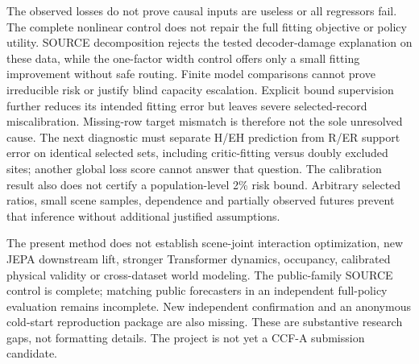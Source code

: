 \documentclass[10pt,twocolumn,letterpaper]{article}
\begin{document}
The observed losses do not prove causal inputs are useless or all regressors
fail. The complete nonlinear control does not repair the full fitting objective
or policy utility. SOURCE decomposition rejects the tested decoder-damage
explanation on these data, while the one-factor width control offers only a
small fitting improvement without safe routing. Finite model comparisons
cannot prove irreducible risk or justify blind capacity escalation.
Explicit bound supervision further reduces its intended fitting error but
leaves severe selected-record miscalibration. Missing-row target mismatch is
therefore not the sole unresolved cause. The next diagnostic must separate
H/EH prediction from R/ER support error on identical selected sets, including
critic-fitting versus doubly excluded sites; another global loss score cannot
answer that question.
The calibration result also does not certify a population-level 2\% risk bound.
Arbitrary selected ratios, small scene samples, dependence and partially
observed futures prevent that inference without additional justified assumptions.

The present method does not establish scene-joint interaction optimization,
new JEPA downstream lift, stronger Transformer dynamics, occupancy, calibrated
physical validity or cross-dataset world modeling. The public-family SOURCE
control is complete; matching public forecasters in an independent full-policy
evaluation remains incomplete. New independent
confirmation and an anonymous cold-start reproduction package are also missing.
These are substantive research gaps, not formatting details. The project is
not yet a CCF-A submission candidate.
\end{document}
